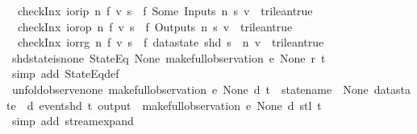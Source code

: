 \begin{isabellebody}
\ \ {\isachardoublequoteopen}checkInx\ ior{\isachardot}ip\ n\ f\ v\ s\ {\isacharequal}\ {\isacharparenleft}f\ {\isacharparenleft}Some\ {\isacharparenleft}Inputs\ {\isacharparenleft}n{\isacharminus}{}{\isacharparenright}\ s{\isacharparenright}{\isacharparenright}\ v\ {\isacharequal}\ trilean{\isachardot}true{\isacharparenright}{\isachardoublequoteclose}\ {\isacharbar}\isanewline
\ \ {\isachardoublequoteopen}checkInx\ ior{\isachardot}op\ n\ f\ v\ s\ {\isacharequal}\ {\isacharparenleft}f\ {\isacharparenleft}Outputs\ n\ s{\isacharparenright}\ v\ {\isacharequal}\ trilean{\isachardot}true{\isacharparenright}{\isachardoublequoteclose}\ {\isacharbar}\isanewline
\ \ {\isachardoublequoteopen}checkInx\ ior{\isachardot}rg\ n\ f\ v\ s\ {\isacharequal}\ {\isacharparenleft}f\ {\isacharparenleft}datastate\ {\isacharparenleft}shd\ s{\isacharparenright}\ {\isachardollar}\ n{\isacharparenright}\ v\ {\isacharequal}\ trilean{\isachardot}true{\isacharparenright}{\isachardoublequoteclose}\isanewline
\isanewline
{}\isamarkupfalse%
\ shd{\isacharunderscore}state{\isacharunderscore}is{\isacharunderscore}none{\isacharcolon}\ {\isachardoublequoteopen}{\isacharparenleft}StateEq\ None{\isacharparenright}\ {\isacharparenleft}make{\isacharunderscore}full{\isacharunderscore}observation\ e\ None\ r\ t{\isacharparenright}{\isachardoublequoteclose}\isanewline
%
\isadelimproof
\ \ %
\endisadelimproof
%
\isatagproof
{}\isamarkupfalse%
\ {\isacharparenleft}simp\ add{\isacharcolon}\ StateEq{\isacharunderscore}def{\isacharparenright}%
\endisatagproof
{\isafoldproof}%
%
\isadelimproof
\isanewline
%
\endisadelimproof
\isanewline
{}\isamarkupfalse%
\ unfold{\isacharunderscore}observe{\isacharunderscore}none{\isacharcolon}\ {\isachardoublequoteopen}make{\isacharunderscore}full{\isacharunderscore}observation\ e\ None\ d\ t\ {\isacharequal}\ {\isacharparenleft}{\isasymlparr}statename\ {\isacharequal}\ None{\isacharcomma}\ datastate\ {\isacharequal}\ d{\isacharcomma}\ event{\isacharequal}{\isacharparenleft}shd\ t{\isacharparenright}{\isacharcomma}\ output\ {\isacharequal}\ {\isacharbrackleft}{\isacharbrackright}{\isasymrparr}{\isacharhash}{\isacharhash}{\isacharparenleft}make{\isacharunderscore}full{\isacharunderscore}observation\ e\ None\ d\ {\isacharparenleft}stl\ t{\isacharparenright}{\isacharparenright}{\isacharparenright}{\isachardoublequoteclose}\isanewline
%
\isadelimproof
\ \ %
\endisadelimproof
%
\isatagproof
{}\isamarkupfalse%
\ {\isacharparenleft}simp\ add{\isacharcolon}\ stream{\isachardot}expand{\isacharparenright}%
\endisatagproof

\end{isabellebody}

